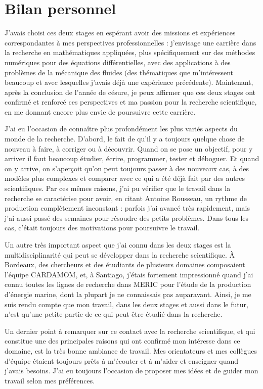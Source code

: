 \part*{Bilan personnel}

\indent J'avais choisi ces deux stages en espérant avoir des missions et expériences correspondantes à mes perspectives professionnelles : j'envisage une carrière dans la recherche en mathématiques appliquées, plus spécifiquement sur des méthodes numériques pour des équations différentielles, avec des applications à des problèmes de la mécanique des fluides (des thématiques que m'intéressent beaucoup et avec lesquelles j'avais déjà une expérience précédente). Maintenant, après la conclusion de l'année de césure, je peux affirmer que ces deux stages ont confirmé et renforcé ces perspectives et ma passion pour la recherche scientifique, en me donnant encore plus envie de poursuivre cette carrière.

\indent J'ai eu l'occasion de connaître plus profondément les plus variés aspects du monde de la recherche. D'abord, le fait de qu'il y a toujours quelque chose de nouveau à faire, à corriger ou à découvrir. Quand on se pose un objectif, pour y arriver il faut beaucoup étudier, écrire, programmer, tester et déboguer. Et quand on y arrive, on s'aperçoit qu'on peut toujours passer à des nouveaux cas, à des modèles plus complexes et comparer avec ce qui a été déjà fait par des autres scientifiques. Par ces mêmes raisons, j'ai pu vérifier que le travail dans la recherche se caractérise pour avoir, en citant Antoine Rousseau, un rythme de production complètement inconstant : parfois j'ai avancé très rapidement, mais j'ai aussi passé des semaines pour résoudre des petits problèmes. Dans tous les cas, c'était toujours des motivations pour poursuivre le travail.

\indent Un autre très important aspect que j'ai connu dans les deux stages est la multidisciplinarité qui peut se développer dans la recherche scientifique. À Bordeaux, des chercheurs et des étudiants de plusieurs domaines composaient l'équipe CARDAMOM, et, à Santiago, j'étais fortement impressionné quand j'ai connu toutes les lignes de recherche dans MERIC pour l'étude de la production d'énergie marine, dont la plupart je ne connaissais pas auparavant. Ainsi, je me suis rendu compte que mon travail, dans les deux stages et aussi dans le futur, n'est qu'une petite partie de ce qui peut être étudié dans la recherche.

\indent Un dernier point à remarquer sur ce contact avec la recherche scientifique, et qui constitue une des principales raisons qui ont confirmé mon intéresse dans ce domaine, est la très bonne ambiance de travail. Mes orientateurs et mes collègues d'équipe étaient toujours prêts à m'écouter et à m'aider et enseigner quand j'avais besoins. J'ai eu toujours l'occasion de proposer mes idées et de guider mon travail selon mes préférences.

